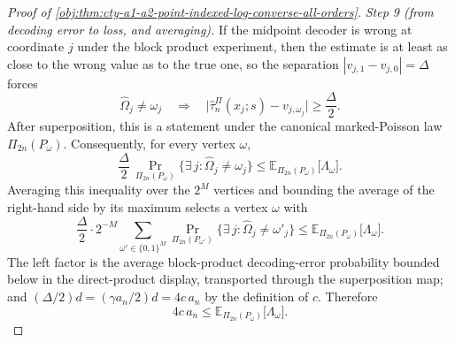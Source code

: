 \documentclass[11pt]{article}
\begin{document}
\begin{proof}[Proof of \cref{obj:thm:cty-a1-a2-point-indexed-log-converse-all-orders}]
\emph{Step 9 (from decoding error to loss, and averaging).}
If the midpoint decoder is wrong at coordinate \(j\) under the block product
experiment, then the estimate is at least as close to the wrong value as to the
true one, so the separation \(|v_{j,1}-v_{j,0}|=\Delta\) forces
\[
\widehat\Omega_j\neq\omega_j
\quad\Longrightarrow\quad
\bigl|\widehat\tau^{\Pi}_n(x_j;s)-v_{j,\omega_j}\bigr|\geq\frac{\Delta}{2}.
\]
After superposition, this is a statement under the canonical marked-Poisson law
\(\Pi_{2n}(P_\omega)\).  Consequently, for every vertex \(\omega\),
\[
\frac{\Delta}{2}\,
\Pr_{\Pi_{2n}(P_\omega)}\bigl\{\exists\,j:\widehat\Omega_j\neq\omega_j\bigr\}
\leq
\mathbb E_{\Pi_{2n}(P_\omega)}\bigl[\Lambda_\omega\bigr].
\]
Averaging this inequality over the \(2^M\) vertices and bounding the average of
the right-hand side by its maximum selects a vertex \(\omega\) with
\[
\frac{\Delta}{2}\cdot
2^{-M}\sum_{\omega'\in\{0,1\}^M}
\Pr_{\Pi_{2n}(P_{\omega'})}\bigl\{\exists\,j:\widehat\Omega_j\neq\omega'_j\bigr\}
\leq
\mathbb E_{\Pi_{2n}(P_\omega)}\bigl[\Lambda_\omega\bigr].
\]
The left factor is the average block-product decoding-error probability bounded
below in the direct-product display, transported through the superposition map;
and \((\Delta/2)d=(\gamma a_n/2)d=4c\,a_n\) by the definition of \(c\).  Therefore
\[
4c\,a_n\leq\mathbb E_{\Pi_{2n}(P_\omega)}\bigl[\Lambda_\omega\bigr].
\]


\end{proof}
\end{document}

